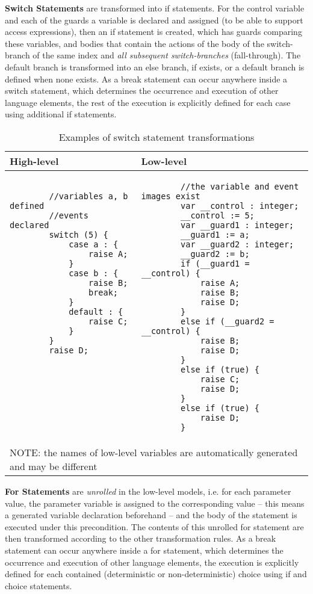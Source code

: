 \bigskip
\textbf{Switch Statements} are transformed into if statements. For the control variable and each of the guards a variable is declared and assigned (to be able to support access expressions), then an if statement is created, which has guards comparing these variables, and bodies that contain the actions of the body of the switch-branch of the same index and \textit{all subsequent switch-branches} (fall-through). The default branch is transformed into an else branch, if exists, or a default branch is defined when none exists. As a break statement can occur anywhere inside a switch statement, which determines the occurrence and execution of other language elements, the rest of the execution is explicitly defined for each case using additional if statements.

\begin{table}[H]
	\footnotesize
	\centering
	\begin{tabular}{ p{7cm} p{7cm} }
		\toprule
		High-level & Low-level \\
		\midrule
		\begin{lstlisting}
		//variables a, b defined
		//events declared
		switch (5) {
			case a : {
				raise A;
			}
			case b : {
				raise B;
				break;
			}
			default : {
				raise C;
			}
		}
		raise D;
		
		
		
		
		
		
		
		\end{lstlisting} & 
		\begin{lstlisting}
		//the variable and event images exist
		var __control : integer;
		__control := 5;
		var __guard1 : integer;
		__guard1 := a;
		var __guard2 : integer;
		__guard2 := b;
		if (__guard1 = __control) {
			raise A;
			raise B;
			raise D;
		} 
		else if (__guard2 = __control) {
			raise B;
			raise D;
		}
		else if (true) {
			raise C;
			raise D;
		}
		else if (true) {
			raise D;
		}\end{lstlisting} \\
		\bottomrule
		\multicolumn{2}{l}{NOTE: the names of low-level variables are automatically generated and may be different}
	\end{tabular}
	\caption{Examples of switch statement transformations}
	\label{tab:SCLLSwitchStatementExample}
\end{table}

\bigskip
\textbf{For Statements} are \textit{unrolled} in the low-level models, i.e. for each parameter value, the parameter variable is assigned to the corresponding value -- this means a generated variable declaration beforehand -- and the body of the statement is executed under this precondition. The contents of this unrolled for statement are then transformed according to the other transformation rules. As a break statement can occur anywhere inside a for statement, which determines the occurrence and execution of other language elements, the execution is explicitly defined for each contained (deterministic or non-deterministic) choice using if and choice statements.

